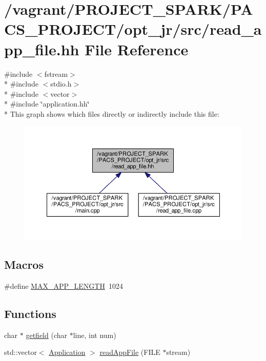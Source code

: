 \hypertarget{read__app__file_8hh}{\section{/vagrant/\-P\-R\-O\-J\-E\-C\-T\-\_\-\-S\-P\-A\-R\-K/\-P\-A\-C\-S\-\_\-\-P\-R\-O\-J\-E\-C\-T/opt\-\_\-jr/src/read\-\_\-app\-\_\-file.hh File Reference}
\label{read__app__file_8hh}
}
{\ttfamily \#include $<$fstream$>$}\\*
{\ttfamily \#include $<$stdio.\-h$>$}\\*
{\ttfamily \#include $<$vector$>$}\\*
{\ttfamily \#include \char`\"{}application.\-hh\char`\"{}}\\*
This graph shows which files directly or indirectly include this file\-:\nopagebreak
\begin{figure}[H]
\begin{center}
\leavevmode
\includegraphics[width=350pt]{read__app__file_8hh__dep__incl}
\end{center}
\end{figure}
\subsection*{Macros}
\begin{DoxyCompactItemize}
\item 
\#define \hyperlink{read__app__file_8hh_a7ed282204b454e197643642cd5168211}{M\-A\-X\-\_\-\-A\-P\-P\-\_\-\-L\-E\-N\-G\-T\-H}~1024
\end{DoxyCompactItemize}
\subsection*{Functions}
\begin{DoxyCompactItemize}
\item 
char $\ast$ \hyperlink{read__app__file_8hh_a28f2319f14673125b080c828eac27d7a}{getfield} (char $\ast$line, int num)
\item 
std\-::vector$<$ \hyperlink{classApplication}{Application} $>$ \hyperlink{read__app__file_8hh_aa73d7abbbef707bf918fbef4c1942cae}{read\-App\-File} (F\-I\-L\-E $\ast$stream)
\end{DoxyCompactItemize}
